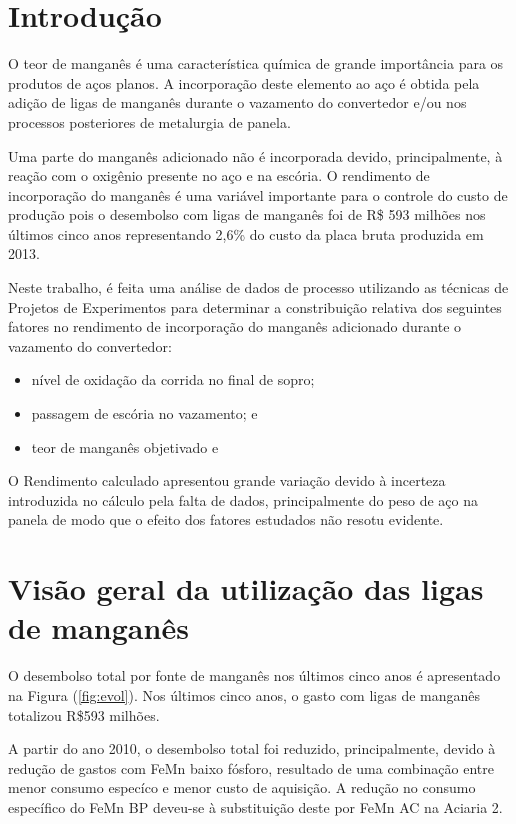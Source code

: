 \pagestyle{plain}
\setcounter{page}{1}
\section{Introdução}
	O teor de manganês é uma característica química de grande importância para os produtos de aços planos. A incorporação deste elemento ao aço é obtida pela adição de ligas de manganês durante o vazamento do convertedor e/ou nos processos posteriores de metalurgia de panela.
	
	Uma parte do manganês adicionado não é incorporada devido, principalmente, à reação com o oxigênio presente no aço e na escória. O rendimento de incorporação do manganês é uma variável importante para o controle do custo de produção pois o desembolso com ligas de manganês foi de R\$ 593 milhões nos últimos cinco anos representando 2,6\% \cite{r2acu} do custo da placa bruta produzida em 2013.
	
	Neste trabalho, é feita uma análise de dados de processo utilizando as técnicas de Projetos de Experimentos para determinar a constribuição relativa dos seguintes fatores no rendimento de incorporação do manganês adicionado durante o vazamento do convertedor:
	\begin{itemize}\itemsep4pt \parskip0pt 
		\item{nível de oxidação da corrida no final de sopro;}
		\item{passagem de escória no vazamento; e}
		\item{teor de manganês objetivado e}
	\end{itemize}	
	
	O Rendimento calculado apresentou grande variação devido à incerteza introduzida no cálculo pela falta de dados, principalmente do peso de aço na panela de modo que o efeito dos fatores estudados não resotu evidente.
\section{Visão geral da utilização das ligas de manganês}
	O desembolso total por fonte de manganês nos últimos cinco anos é apresentado na Figura (\ref{fig:evol}). Nos últimos cinco anos, o gasto com ligas de manganês totalizou R\$593 milhões. 
	
	A partir do ano 2010, o desembolso total foi reduzido, principalmente, devido à redução de gastos com FeMn baixo fósforo, resultado de uma combinação entre menor consumo especíco e menor custo de aquisição. A redução no consumo específico do FeMn BP deveu-se à substituição deste por FeMn AC na Aciaria 2.

